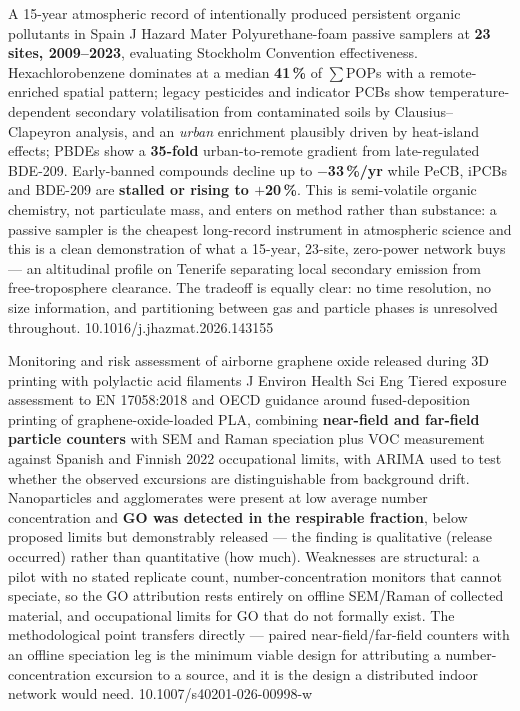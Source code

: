 \documentclass[10pt]{article}
\begin{document}
{A 15-year atmospheric record of intentionally produced persistent organic pollutants in Spain}
{J Hazard Mater}
{Polyurethane-foam passive samplers at \textbf{23 sites, 2009--2023}, evaluating
Stockholm Convention effectiveness. Hexachlorobenzene dominates at a median
\textbf{41\,\%} of $\sum$POPs with a remote-enriched spatial pattern; legacy pesticides
and indicator PCBs show temperature-dependent secondary volatilisation from contaminated
soils by Clausius--Clapeyron analysis, and an \emph{urban} enrichment plausibly driven by
heat-island effects; PBDEs show a \textbf{35-fold} urban-to-remote gradient from
late-regulated BDE-209. Early-banned compounds decline up to \textbf{$-$33\,\%/yr} while
PeCB, iPCBs and BDE-209 are \textbf{stalled or rising to $+$20\,\%}. This is semi-volatile
organic chemistry, not particulate mass, and enters on method rather than substance: a
passive sampler is the cheapest long-record instrument in atmospheric science and this is
a clean demonstration of what a 15-year, 23-site, zero-power network buys --- an
altitudinal profile on Tenerife separating local secondary emission from free-troposphere
clearance. The tradeoff is equally clear: no time resolution, no size information, and
partitioning between gas and particle phases is unresolved throughout.}
{10.1016/j.jhazmat.2026.143155}


{Monitoring and risk assessment of airborne graphene oxide released during 3D printing with polylactic acid filaments}
{J Environ Health Sci Eng}
{Tiered exposure assessment to EN 17058:2018 and OECD guidance around fused-deposition
printing of graphene-oxide-loaded PLA, combining \textbf{near-field and far-field particle
counters} with SEM and Raman speciation plus VOC measurement against Spanish and Finnish
2022 occupational limits, with ARIMA used to test whether the observed excursions are
distinguishable from background drift. Nanoparticles and agglomerates were present at low
average number concentration and \textbf{GO was detected in the respirable fraction},
below proposed limits but demonstrably released --- the finding is qualitative
(release occurred) rather than quantitative (how much). Weaknesses are structural: a
pilot with no stated replicate count, number-concentration monitors that cannot speciate,
so the GO attribution rests entirely on offline SEM/Raman of collected material, and
occupational limits for GO that do not formally exist. The methodological point
transfers directly --- paired near-field/far-field counters with an offline speciation
leg is the minimum viable design for attributing a number-concentration excursion to a
source, and it is the design a distributed indoor network would need.}
{10.1007/s40201-026-00998-w}
\end{document}
